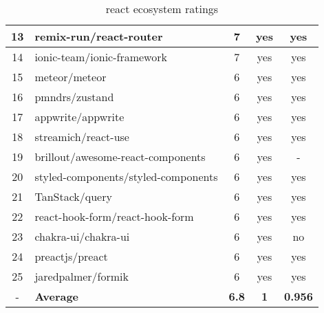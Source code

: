 \begin{table}[H]
{\begin{tabular}{|c|l|c|c|c|}
            13 & remix-run/react-router              & 7                  & yes                        & yes                \\ \hline
            14 & ionic-team/ionic-framework          & 7                  & yes                        & yes                \\ \hline
            15 & meteor/meteor                       & 6                  & yes                        & yes                \\ \hline
            16 & pmndrs/zustand                      & 6                  & yes                        & yes                \\ \hline
            17 & appwrite/appwrite                   & 6                  & yes                        & yes                \\ \hline
            18 & streamich/react-use                 & 6                  & yes                        & yes                \\ \hline
            19 & brillout/awesome-react-components   & 6                  & yes                        & -                  \\ \hline
            20 & styled-components/styled-components & 6                  & yes                        & yes                \\ \hline
            21 & TanStack/query                      & 6                  & yes                        & yes                \\ \hline
            22 & react-hook-form/react-hook-form     & 6                  & yes                        & yes                \\ \hline
            23 & chakra-ui/chakra-ui                 & 6                  & yes                        & no                 \\ \hline
            24 & preactjs/preact                     & 6                  & yes                        & yes                \\ \hline
            25 & jaredpalmer/formik                  & 6                  & yes                        & yes                \\ \hline
            -  & \textbf{Average}                    & \textbf{6.8}       & \textbf{1}                 & \textbf{0.956}     \\ \hline
        \end{tabular}
    }
    \caption{react ecosystem ratings}
    \label{tab:metrics:react:ratings}
\end{table}

